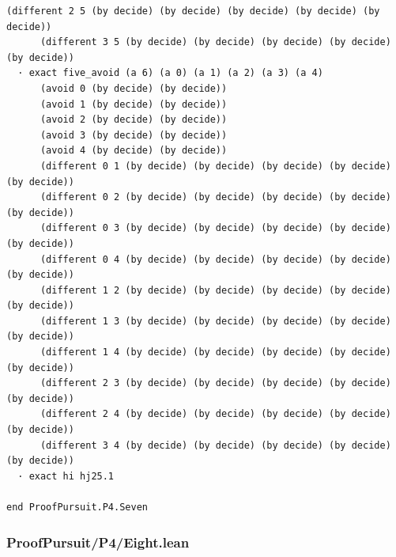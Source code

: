 \documentclass[11pt,a4paper]{article}
\begin{document}
\begin{Verbatim}[breaklines,breakanywhere,fontsize=\footnotesize]
      (different 2 5 (by decide) (by decide) (by decide) (by decide) (by decide))
      (different 3 5 (by decide) (by decide) (by decide) (by decide) (by decide))
  · exact five_avoid (a 6) (a 0) (a 1) (a 2) (a 3) (a 4)
      (avoid 0 (by decide) (by decide))
      (avoid 1 (by decide) (by decide))
      (avoid 2 (by decide) (by decide))
      (avoid 3 (by decide) (by decide))
      (avoid 4 (by decide) (by decide))
      (different 0 1 (by decide) (by decide) (by decide) (by decide) (by decide))
      (different 0 2 (by decide) (by decide) (by decide) (by decide) (by decide))
      (different 0 3 (by decide) (by decide) (by decide) (by decide) (by decide))
      (different 0 4 (by decide) (by decide) (by decide) (by decide) (by decide))
      (different 1 2 (by decide) (by decide) (by decide) (by decide) (by decide))
      (different 1 3 (by decide) (by decide) (by decide) (by decide) (by decide))
      (different 1 4 (by decide) (by decide) (by decide) (by decide) (by decide))
      (different 2 3 (by decide) (by decide) (by decide) (by decide) (by decide))
      (different 2 4 (by decide) (by decide) (by decide) (by decide) (by decide))
      (different 3 4 (by decide) (by decide) (by decide) (by decide) (by decide))
  · exact hi hj25.1

end ProofPursuit.P4.Seven
\end{Verbatim}

\subsubsection{ProofPursuit/P4/Eight.lean}\label{proofpursuitp4eight.lean}
\end{document}
